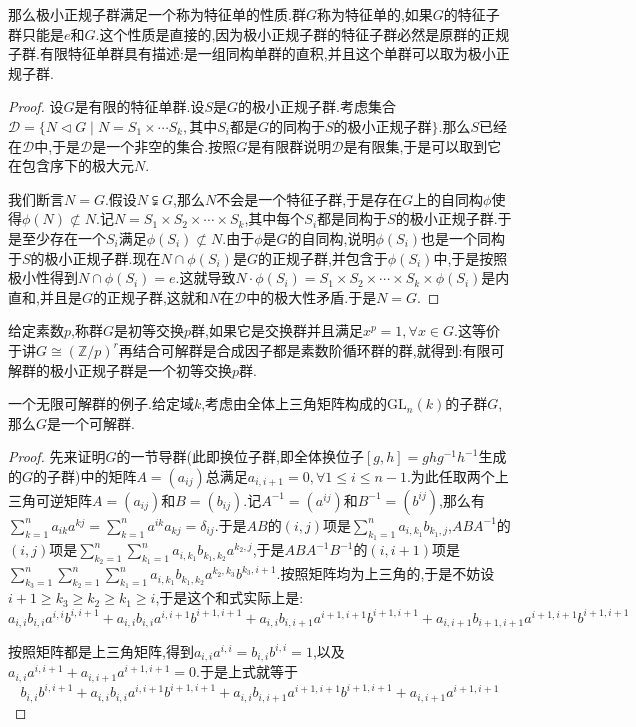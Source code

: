 那么极小正规子群满足一个称为特征单的性质.群$G$称为特征单的,如果$G$的特征子群只能是${e}$和$G$.这个性质是直接的,因为极小正规子群的特征子群必然是原群的正规子群.有限特征单群具有描述:是一组同构单群的直积,并且这个单群可以取为极小正规子群.
\begin{proof}
	
	设$G$是有限的特征单群.设$S$是$G$的极小正规子群.考虑集合$\mathscr{D}=\{N\triangleleft G\mid N=S_1\times\cdots S_k,\text{其中}S_i\text{都是}G\text{的同构于}S\text{的极小正规子群}\}$.那么$S$已经在$\mathscr{D}$中,于是$\mathscr{D}$是一个非空的集合.按照$G$是有限群说明$\mathscr{D}$是有限集,于是可以取到它在包含序下的极大元$N$.
	
	我们断言$N=G$.假设$N\subsetneqq G$,那么$N$不会是一个特征子群,于是存在$G$上的自同构$\phi$使得$\phi(N)\not\subset N$.记$N=S_1\times S_2\times\cdots\times S_k$,其中每个$S_i$都是同构于$S$的极小正规子群.于是至少存在一个$S_i$满足$\phi(S_i)\not\subset N$.由于$\phi$是$G$的自同构,说明$\phi(S_i)$也是一个同构于$S$的极小正规子群.现在$N\cap\phi(S_i)$是$G$的正规子群,并包含于$\phi(S_i)$中,于是按照极小性得到$N\cap\phi(S_i)={e}$.这就导致$N\cdot\phi(S_i)=S_1\times S_2\times\cdots\times S_k\times\phi(S_i)$是内直和,并且是$G$的正规子群,这就和$N$在$\mathscr{D}$中的极大性矛盾.于是$N=G$.
\end{proof}

给定素数$p$,称群$G$是初等交换$p$群,如果它是交换群并且满足$x^p=1,\forall x\in G$.这等价于讲$G\cong (\mathbb{Z}/p)^r$再结合可解群是合成因子都是素数阶循环群的群,就得到:有限可解群的极小正规子群是一个初等交换$p$群.

一个无限可解群的例子.给定域$k$,考虑由全体上三角矩阵构成的$\mathrm{GL}_n(k)$的子群$G$,那么$G$是一个可解群.
\begin{proof}
	
	先来证明$G$的一节导群(此即换位子群,即全体换位子$[g,h]=ghg^{-1}h^{-1}$生成的$G$的子群)中的矩阵$A=(a_{ij})$总满足$a_{i,i+1}=0,\forall 1\le i\le n-1$.为此任取两个上三角可逆矩阵$A=(a_{ij})$和$B=(b_{ij})$.记$A^{-1}=(a^{ij})$和$B^{-1}=(b^{ij})$,那么有$\sum_{k=1}^na_{ik}a^{kj}=\sum_{k=1}^na^{ik}a_{kj}=\delta_{ij}$.于是$AB$的$(i,j)$项是$\sum_{k_1=1}^na_{i,k_1}b_{k_1,j}$,$ABA^{-1}$的$(i,j)$项是$\sum_{k_2=1}^n\sum_{k_1=1}^na_{i,k_1}b_{k_1,k_2}a^{k_2,j}$,于是$ABA^{-1}B^{-1}$的$(i,i+1)$项是$\sum_{k_3=1}^n\sum_{k_2=1}^n\sum_{k_1=1}^na_{i,k_1}b_{k_1,k_2}a^{k_2,k_3}b^{k_3,i+1}$.按照矩阵均为上三角的,于是不妨设$i+1\ge k_3\ge k_2\ge k_1\ge i$,于是这个和式实际上是:
	$$a_{i,i}b_{i,i}a^{i,i}b^{i,i+1}+a_{i,i}b_{i,i}a^{i,i+1}b^{i+1,i+1}+a_{i,i}b_{i,i+1}a^{i+1,i+1}b^{i+1,i+1}+a_{i,i+1}b_{i+1,i+1}a^{i+1,i+1}b^{i+1,i+1}$$
	
	按照矩阵都是上三角矩阵,得到$a_{i,i}a^{i,i}=b_{i,i}b^{i,i}=1$,以及$a_{i,i}a^{i,i+1}+a_{i,i+1}a^{i+1,i+1}=0$.于是上式就等于
	$$b_{i,i}b^{i,i+1}+a_{i,i}b_{i,i}a^{i,i+1}b^{i+1,i+1}+a_{i,i}b_{i,i+1}a^{i+1,i+1}b^{i+1,i+1}+a_{i,i+1}a^{i+1,i+1}$$
\end{proof}





